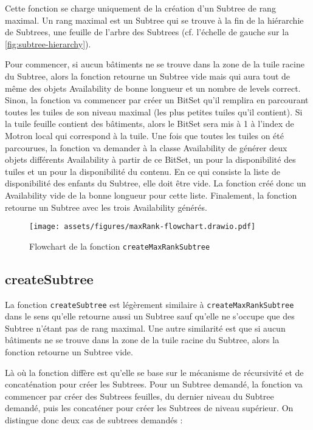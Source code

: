 Cette fonction se charge uniquement de la création d'un Subtree de rang maximal. Un rang maximal est un Subtree qui se trouve à la fin de la hiérarchie de Subtrees, une feuille de l'arbre des Subtrees (cf. l'échelle de gauche sur la \autoref{fig:subtree-hierarchy}).

Pour commencer, si aucun bâtiments ne se trouve dans la zone de la tuile racine du Subtree, alors la fonction retourne un Subtree vide mais qui aura tout de même des objets Availability de bonne longueur et un nombre de levels correct. Sinon, la fonction va commencer par créer un BitSet qu'il remplira en parcourant toutes les tuiles de son niveau maximal (les plus petites tuiles qu'il contient). Si la tuile feuille contient des bâtiments, alors le BitSet sera mis à 1 à l'index de Motron local qui correspond à la tuile. Une fois que toutes les tuiles on été parcourues, la fonction va demander à la classe Availability de générer deux objets différents Availability à partir de ce BitSet, un pour la disponibilité des tuiles et un pour la disponibilité du contenu. En ce qui consiste la liste de disponibilité des enfants du Subtree, elle doit être vide. La fonction créé donc un Availability vide de la bonne longueur pour cette liste. Finalement, la fonction retourne un Subtree avec les trois Availability générés.

\begin{figure}[H]
    \centering
    \texttt{[image: assets/figures/maxRank-flowchart.drawio.pdf]}
    \caption{Flowchart de la fonction \texttt{createMaxRankSubtree}}
    \label{fig:maxrank-flowchart}
\end{figure}

\newpage
\subsection*{createSubtree}

La fonction \texttt{createSubtree} est légèrement similaire à \texttt{createMaxRankSubtree} dans le sens qu'elle retourne aussi un Subtree sauf qu'elle ne s'occupe que des Subtree n'étant pas de rang maximal. Une autre similarité est que si aucun bâtiments ne se trouve dans la zone de la tuile racine du Subtree, alors la fonction retourne un Subtree vide.

Là où la fonction diffère est qu'elle se base sur le mécanisme de récursivité et de concaténation pour créer les Subtrees. Pour un Subtree demandé, la fonction va commencer par créer des Subtrees feuilles, du dernier niveau du Subtree demandé, puis les concaténer pour créer les Subtrees de niveau supérieur. On distingue donc deux cas de subtrees demandés :


